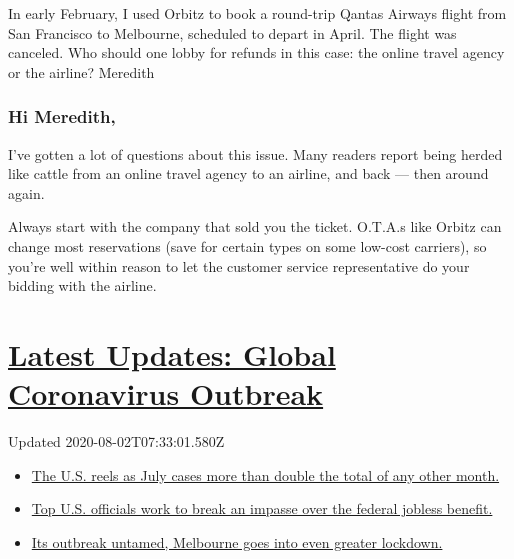 In early February, I used Orbitz to book a round-trip Qantas Airways
flight from San Francisco to Melbourne, scheduled to depart in April.
The flight was canceled. Who should one lobby for refunds in this case:
the online travel agency or the airline? Meredith

\hypertarget{hi-meredith}{%
\subsubsection{Hi Meredith,}\label{hi-meredith}}

I've gotten a lot of questions about this issue. Many readers report
being herded like cattle from an online travel agency to an airline, and
back --- then around again.

Always start with the company that sold you the ticket. O.T.A.s like
Orbitz can change most reservations (save for certain types on some
low-cost carriers), so you're well within reason to let the customer
service representative do your bidding with the airline.

\hypertarget{latest-updates-global-coronavirus-outbreak}{%
\section{\texorpdfstring{\href{https://www.nytimes.com/2020/08/01/world/coronavirus-covid-19.html?action=click\&pgtype=Article\&state=default\&region=MAIN_CONTENT_1\&context=storylines_live_updates}{Latest
Updates: Global Coronavirus
Outbreak}}{Latest Updates: Global Coronavirus Outbreak}}\label{latest-updates-global-coronavirus-outbreak}}

Updated 2020-08-02T07:33:01.580Z

\begin{itemize}
\tightlist
\item
  \href{https://www.nytimes.com/2020/08/01/world/coronavirus-covid-19.html?action=click\&pgtype=Article\&state=default\&region=MAIN_CONTENT_1\&context=storylines_live_updates\#link-34047410}{The
  U.S. reels as July cases more than double the total of any other
  month.}
\item
  \href{https://www.nytimes.com/2020/08/01/world/coronavirus-covid-19.html?action=click\&pgtype=Article\&state=default\&region=MAIN_CONTENT_1\&context=storylines_live_updates\#link-780ec966}{Top
  U.S. officials work to break an impasse over the federal jobless
  benefit.}
\item
  \href{https://www.nytimes.com/2020/08/01/world/coronavirus-covid-19.html?action=click\&pgtype=Article\&state=default\&region=MAIN_CONTENT_1\&context=storylines_live_updates\#link-2bc8948}{Its
  outbreak untamed, Melbourne goes into even greater lockdown.}
\end{itemize}

